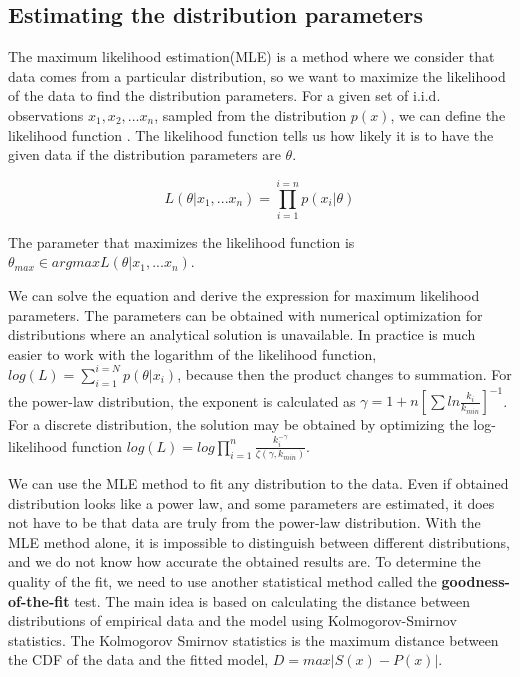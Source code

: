 \subsection{Estimating the distribution parameters}

The maximum likelihood estimation(MLE) is a method where we consider that data comes from a particular distribution, so we want to maximize the likelihood of the data to find the distribution parameters. For a given set of i.i.d. observations $x_1, x_2, ...x_n$, sampled from the distribution $p(x)$, we can define the likelihood function  \cite{nair2022fundamentals}. The likelihood function tells us how likely it is to have the given data if the distribution parameters are $\theta$. 

\begin{equation}
L (\theta| x_1, ... x_n) = \prod_{i=1}^{i=n} p(x_i | \theta)
\end{equation}

The parameter that maximizes the likelihood function is $\theta_{max} \in arg max L(\theta| x_1,... x_n)$.

We can solve the equation and derive the expression for maximum likelihood parameters. The parameters can be obtained with numerical optimization for distributions where an analytical solution is unavailable. In practice is much easier to work with the logarithm of the likelihood function, $log(L) = \sum_{i=1}^{i=N} p(\theta| x_i)$, because then the product changes to summation. For the power-law distribution, the exponent is calculated as  
$\gamma = 1+n[\sum ln \frac{k_i}{k_{min}} ]^{-1}$. For a discrete distribution, the solution may be obtained by optimizing the log-likelihood function $log(L) = log\prod_{i=1}^{n} \frac{k_i^{-\gamma}}{\zeta(\gamma, k_{min})}$.

We can use the MLE \cite{clauset2009power} method to fit any distribution to the data. Even if obtained distribution looks like a power law, and some parameters are estimated, it does not have to be that data are truly from the power-law distribution. With the MLE method alone, it is impossible to distinguish between different distributions, and we do not know how accurate the obtained results are. To determine the quality of the fit, we need to use another statistical method called the \textbf{goodness-of-the-fit} test. The main idea is based on calculating the distance between distributions of empirical data and the model using Kolmogorov-Smirnov statistics. The Kolmogorov Smirnov statistics is the maximum distance between the CDF of the data and the fitted model, $D = max |S(x) - P(x)|$.

